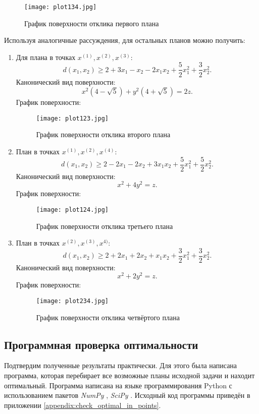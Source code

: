\begin{figure}[h]
	\centering
	\texttt{[image: plot134.jpg]}
	\caption{График поверхности отклика первого плана}
\end{figure}

Используя аналогичные рассуждения, для остальных планов можно получить:
\begin{enumerate}
	\item Для плана в точках $x^{(1)}, x^{(2)}, x^{(3)}$:
	$$d(x_1, x_2) \ge 2 + 3x_1 - x_2 -2x_1x_2 +\frac{5}{2}x_1^2 + \frac 3 2 x_2^2.$$
	Канонический вид поверхности:
	$$x^2 (4 - \sqrt{5}) + y^2 (4 + \sqrt 5) = 2z.$$
	График поверхности:
	
	\begin{figure}[h]
		\centering
		\texttt{[image: plot123.jpg]}
		\caption{График поверхности отклика второго плана}
	\end{figure}
	
	\item План в точках $x^{(1)}, x^{(2)}, x^{(4)}$:
	$$d(x_1, x_2) \ge 2 - 2x_1 - 2x_2 +3x_1x_2 +\frac{5}{2}x_1^2 + \frac 5 2 x_2^2.$$
	Канонический вид поверхности:
	$$x^2 + 4y^2 = z.$$
	График поверхности:
	\begin{figure}[h]
		\centering
		\texttt{[image: plot124.jpg]}
		\caption{График поверхности отклика третьего плана}
	\end{figure}

	\item План в точках $x^{(2)}, x^{(3)}, x^{4)}$:
	$$d(x_1, x_2) \ge 2 + 2x_1 + 2x_2 +x_1x_2 +\frac{3}{2}x_1^2 + \frac 3 2 x_2^2.$$
	Канонический вид поверхности:
	$$x^2 + 2 y^2 = z.$$
	График поверхности:
	\begin{figure}[h]
		\centering
		\texttt{[image: plot234.jpg]}
		\caption{График поверхности отклика четвёртого плана}
	\end{figure}
\end{enumerate}

\subsection{Программная проверка оптимальности}
Подтвердим полученные результаты практически. Для этого была написана программа, которая перебирает все возможные планы исходной задачи и находит оптимальный. Программа написана на языке программирования Python с использованием пакетов \textit{NumPy} \cite{numpy}, \textit{SciPy} \cite{scipy}. Исходный код программы приведён в приложении \ref{appendix:check_optimal_in_points}.

